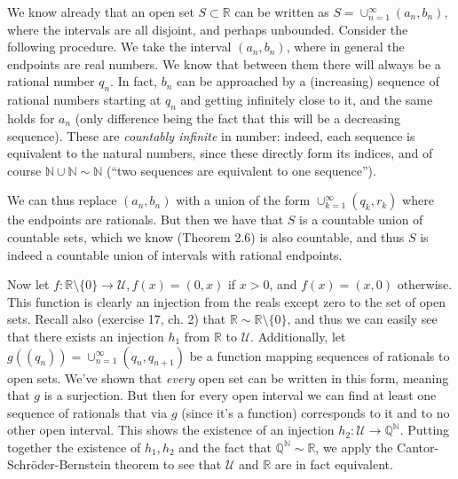 \begin{solution}
    
    We know already that an open set $S \subset \mathbb{R}$ can be written as $S = \cup_{n=1}^{\infty}(a_n, b_n)$, where the intervals are all disjoint, and perhaps unbounded.
    Consider the following procedure.
    We take the interval $(a_n, b_n)$, where in general the endpoints are real numbers.
    We know that between them there will always be a rational number $q_n$.
    In fact, $b_n$ can be approached by a (increasing) sequence of rational numbers starting at $q_n$ and getting infinitely close to it, and the same holds for $a_n$ (only difference being the fact that this will be a decreasing sequence).
    These are \textit{countably infinite} in number: indeed, each sequence is equivalent to the natural numbers, since these directly form its indices, and of course $\mathbb{N} \cup \mathbb{N} \sim \mathbb{N}$ (``two sequences are equivalent to one sequence'').

    We can thus replace $(a_n, b_n)$ with a union of the form $\cup_{k=1}^{\infty} (q_k, r_k)$ where the endpoints are rationals.
    But then we have that $S$ is a countable union of countable sets, which we know (Theorem 2.6)  is also countable, and thus $S$ is indeed a countable union of intervals with rational endpoints.

    Now let $f: \mathbb{R} \setminus \{0\} \rightarrow \mathcal{U}, f(x) = (0, x)$ if $x > 0$, and $f(x) = (x, 0)$ otherwise. 
    This function is clearly an injection from the reals except zero to the set of open sets.
    Recall also (exercise 17, ch. 2) that $\mathbb{R} \sim \mathbb{R} \setminus \{0\}$, and thus we can easily see that there exists an injection $h_1$ from $\mathbb{R}$ to $\mathcal{U}$.
    Additionally, let $g((q_n)) = \cup_{n=1}^{\infty} (q_n, q_{n+1})$ be a function mapping sequences of rationals to open sets.
    We've shown that \textit{every} open set can be written in this form, meaning that $g$ is a surjection.
    But then for every open interval we can find at least one sequence of rationals that via $g$ (since it's a function) corresponds to it and to no other open interval.
    This shows the existence of an injection $h_2: \mathcal{U} \rightarrow \mathbb{Q}^{\mathbb{N}}$.
    Putting together the existence of $h_1, h_2$ and the fact that $\mathbb{Q}^{\mathbb{N}} \sim \mathbb{R}$, we apply the Cantor-Schröder-Bernstein theorem to see that $\mathcal{U}$ and $\mathbb{R}$ are in fact equivalent.
\end{solution}

